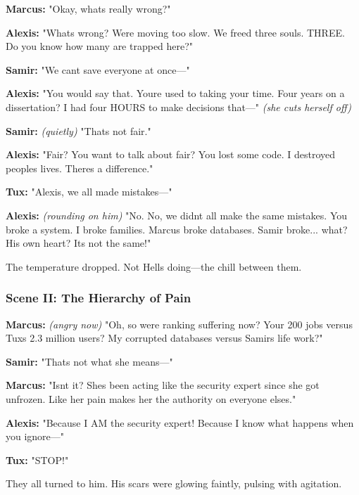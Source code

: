 \textbf{Marcus:} "Okay, what\textquotesingle s really wrong?"

\textbf{Alexis:} "What\textquotesingle s wrong? We\textquotesingle re moving too slow. We freed three souls. THREE. Do you know how many are trapped here?"

\textbf{Samir:} "We can\textquotesingle t save everyone at once---"

\textbf{Alexis:} "You would say that. You\textquotesingle re used to taking your time. Four years on a dissertation? I had four HOURS to make decisions that---" \emph{(she cuts herself off)}

\textbf{Samir:} \emph{(quietly)} "That\textquotesingle s not fair."

\textbf{Alexis:} "Fair? You want to talk about fair? You lost some code. I destroyed people\textquotesingle s lives. There\textquotesingle s a difference."

\textbf{Tux:} "Alexis, we all made mistakes---"

\textbf{Alexis:} \emph{(rounding on him)} "No. No, we didn\textquotesingle t all make the same mistakes. You broke a system. I broke families. Marcus broke databases. Samir broke... what? His own heart? It\textquotesingle s not the same!"

The temperature dropped. Not Hell\textquotesingle s doing---the chill between them.

\bookdivider

\subsubsection{Scene II: The Hierarchy of Pain}\label{scene-ii-the-hierarchy-of-pain}

\textbf{Marcus:} \emph{(angry now)} "Oh, so we\textquotesingle re ranking suffering now? Your 200 jobs versus Tux\textquotesingle s 2.3 million users? My corrupted databases versus Samir\textquotesingle s life work?"

\textbf{Samir:} "That\textquotesingle s not what she means---"

\textbf{Marcus:} "Isn\textquotesingle t it? She\textquotesingle s been acting like the security expert since she got unfrozen. Like her pain makes her the authority on everyone else\textquotesingle s."

\textbf{Alexis:} "Because I AM the security expert! Because I know what happens when you ignore---"

\textbf{Tux:} "STOP!"

They all turned to him. His scars were glowing faintly, pulsing with agitation.

